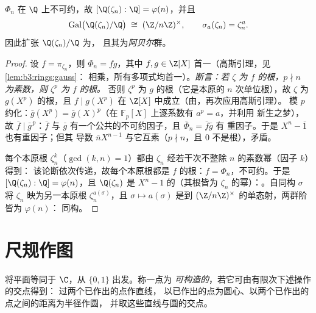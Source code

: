 \begin{theorem}\label{thm:b3:galois:cyclotomicirred}
$\Phi_n$ 在 $\Q$ 上不可约，故 $[\Q(\zeta_n) : \Q] =
\varphi(n)$，并且
\[
\operatorname{Gal}\bigl(\Q(\zeta_n)/\Q\bigr) \;\cong\;
(\Z/n\Z)^\times,
\qquad \sigma_a(\zeta_n) = \zeta_n^a .
\]
因此扩张 $\Q(\zeta_n)/\Q$ 为，
且其为\emph{阿贝尔}群。
\end{theorem}

\begin{proof}
设 $f = \pi_{\zeta_n}$，则 $\Phi_n = fg$，其中 $f, g \in \Z[X]$
首一（高斯引理，见\cref{lem:b3:rings:gauss}：
相乘，所有多项式均首一）。\emph{断言：若 $\zeta$ 为
$f$ 的根，$p \nmid n$ 为素数，则 $\zeta^p$ 为
$f$ 的根。} 否则 $\zeta^p$ 为 $g$ 的根（它是本原的
$n$ 次单位根），故 $\zeta$ 为 $g(X^p)$ 的根，且 $f
\mid g(X^p)$ 在 $\Z[X]$ 中成立（由，再次应用高斯引理）。
模 $p$ 约化：$\bar g(X^p) = \bar g(X)^p$（在 $\mathbb F_p[X]$ 上逐系数有 $a^p = a$，并利用
新生之梦），故 $\bar f \mid \bar g^{\,p}$：$\bar f$ 与 $\bar g$
有一个公共的不可约因子，且 $\bar\Phi_n = \bar f\bar g$ 有
重因子。于是 $X^n - \bar 1$ 也有重因子；但其
导数 $\bar nX^{n-1}$ 与它互素（$p \nmid n$，且
$0$ 不是根），矛盾。

每个本原根 $\zeta_n^k$（$\gcd(k, n) = 1$）都由
$\zeta_n$ 经若干次不整除 $n$ 的素数幂（因子 $k$）得到：
该论断依次传递，故每个本原根都是
$f$ 的根：$f = \Phi_n$，不可约。于是
$[\Q(\zeta_n):\Q] = \varphi(n)$，且 $\Q(\zeta_n)$ 是
 $X^n - 1$ 的（其根皆为
$\zeta_n$ 的幂）：。自同构 $\sigma$ 将 $\zeta_n$
映为另一本原根 $\zeta_n^{a(\sigma)}$，且 $\sigma
\mapsto a(\sigma)$ 是到
$(\Z/n\Z)^\times$ 的单态射，两群阶皆为 $\varphi(n)$：
同构。
\end{proof}

\section{尺规作图}

\begin{definition}\label{def:b3:galois:constructible}
将平面等同于 $\C$，从 $\{0, 1\}$ 出发。称一点为
\emph{可构造的}，若它可由有限次下述操作的交点得到：
过两个已作出的点作直线，
以已作出的点为圆心、以两个已作出的点之间的距离为半径作圆，
并取这些直线与圆的交点。
\end{definition}

